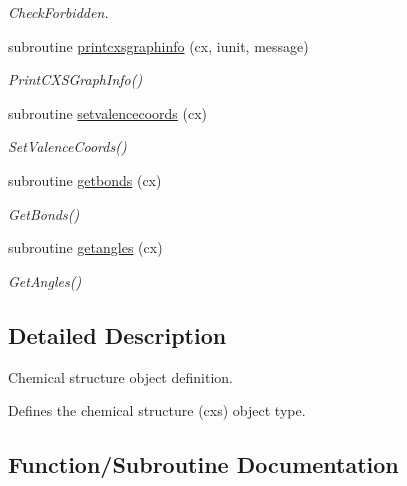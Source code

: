 \begin{DoxyCompactItemize}
\begin{DoxyCompactList}\small\item\em Check\+Forbidden. \end{DoxyCompactList}\item 
subroutine \mbox{\hyperlink{namespacechemstr_a04d94078390085dcf855f8df499ef7cc}{printcxsgraphinfo}} (cx, iunit, message)
\begin{DoxyCompactList}\small\item\em Print\+C\+X\+S\+Graph\+Info() \end{DoxyCompactList}\item 
subroutine \mbox{\hyperlink{namespacechemstr_aa485abde3fe586d791e147ad9014a81b}{setvalencecoords}} (cx)
\begin{DoxyCompactList}\small\item\em Set\+Valence\+Coords() \end{DoxyCompactList}\item 
subroutine \mbox{\hyperlink{namespacechemstr_a5f87f4ee909fc5c3c54278aca9df1241}{getbonds}} (cx)
\begin{DoxyCompactList}\small\item\em Get\+Bonds() \end{DoxyCompactList}\item 
subroutine \mbox{\hyperlink{namespacechemstr_acffc073bd33497662f25faf7a2beee56}{getangles}} (cx)
\begin{DoxyCompactList}\small\item\em Get\+Angles() \end{DoxyCompactList}\end{DoxyCompactItemize}


\subsection{Detailed Description}
Chemical structure object definition. 

Defines the chemical structure (cxs) object type. 

\subsection{Function/\+Subroutine Documentation}
\mbox{\label{namespacechemstr_a816dc4c02e3f8a2fa1b2ce158044da9c}} 
